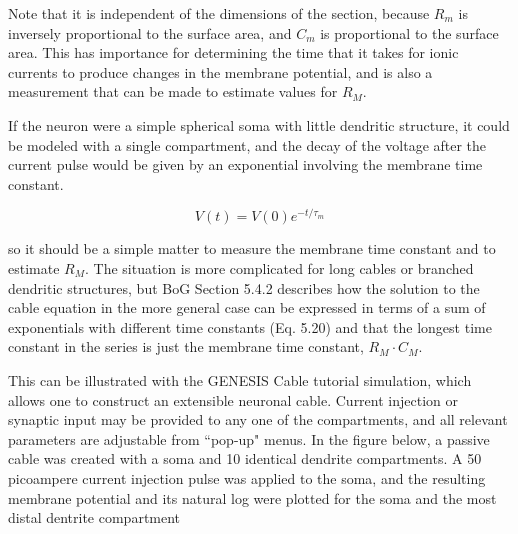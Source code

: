 \documentclass[12pt]{article}
\begin{document}
Note that it is independent of the dimensions of the section, because $R_m$ is inversely proportional to the surface area, and $C_m$ is proportional to the surface area. This has importance for determining the time that it takes for ionic currents to produce changes in the membrane potential, and is also a measurement that can be made to estimate values for $R_M$.

If the neuron were a simple spherical soma with little dendritic structure, it could be modeled with a single compartment, and the decay of the voltage after the current pulse would be given by an exponential involving the membrane time constant.

\begin{displaymath}
	V(t) = V(0) e^{-t/\tau_m}
\end{displaymath}

so it should be a simple matter to measure the membrane time constant and to estimate $R_M$. The situation is more complicated for long cables or branched dendritic structures, but BoG Section 5.4.2 describes how the solution to the cable equation in the more general case can be expressed in terms of a sum of exponentials with different time constants (Eq. 5.20) and that the longest time constant in the series is just the membrane time constant, $R_M\cdot C_M$.

This can be illustrated with the GENESIS Cable tutorial simulation, which allows one to construct an extensible neuronal cable. Current injection or synaptic input may be provided to any one of the compartments, and all relevant parameters are adjustable from ``pop-up" menus. In the figure below, a passive cable was created with a soma and 10 identical dendrite compartments. A 50 picoampere current injection pulse was applied to the soma, and the resulting membrane potential and its natural log were plotted for the soma and the most distal dentrite compartment
\end{document}
